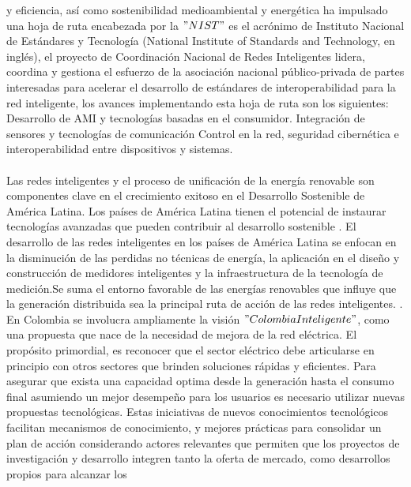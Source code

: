 \documentclass[12pt,letterpaper]{article}
\begin{document}
y eficiencia, así como sostenibilidad medioambiental y energética ha impulsado una hoja de ruta encabezada por la $"NIST"$ es el acrónimo de Instituto Nacional de Estándares y
Tecnología (National Institute of Standards and Technology,
en inglés), el proyecto de Coordinación Nacional de Redes Inteligentes lidera, coordina y gestiona el esfuerzo de la asociación nacional público-privada de partes interesadas para acelerar el desarrollo de estándares de interoperabilidad para la red inteligente, los avances implementando esta hoja de ruta son los siguientes: Desarrollo de AMI y tecnologías basadas en el consumidor. Integración de sensores y tecnologías de comunicación Control en la red, seguridad cibernética e interoperabilidad entre dispositivos y sistemas.
\cite{Nist2014} \cite{Leader2010}
\\
\\
 Las redes inteligentes y el proceso de unificación de la energía renovable son componentes clave en el crecimiento exitoso en el Desarrollo Sostenible de América Latina. Los países de América Latina tienen el potencial de instaurar tecnologías avanzadas que pueden contribuir al desarrollo sostenible \cite{CEPAL2004}\cite{UPME2015}\cite{UnidaddePlaneacionMineroEnergetica2015}. El desarrollo de las redes inteligentes en los países de América Latina se enfocan en la disminución de las perdidas no técnicas de energía, la aplicación en el diseño y construcción de medidores inteligentes y la infraestructura de la tecnología de medición.Se suma el entorno favorable de las energías renovables que influye que la generación distribuida sea la principal ruta de acción de las redes inteligentes.\cite{2554}  \cite{Quintana2012}\cite{Mej2018} \cite{2030HojadeRuta}. En Colombia se involucra ampliamente la visión $"Colombia Inteligente"$, como una propuesta que nace de la necesidad de mejora de la red eléctrica.\cite{ColombiaInteligente2016} El propósito primordial, es reconocer que el sector eléctrico debe articularse en principio con otros sectores que brinden soluciones rápidas y eficientes.  \cite{IngaOrtega2012} \cite{colombiainteligente.org} Para asegurar que exista una capacidad optima desde la generación hasta el consumo final asumiendo un mejor desempeño para los usuarios es necesario utilizar nuevas propuestas tecnológicas. Estas iniciativas de nuevos conocimientos tecnológicos facilitan mecanismos de conocimiento, y mejores prácticas para consolidar un plan de acción  considerando actores relevantes que permiten que los proyectos de investigación y desarrollo integren tanto la oferta de mercado, como desarrollos propios para alcanzar los
\end{document}
